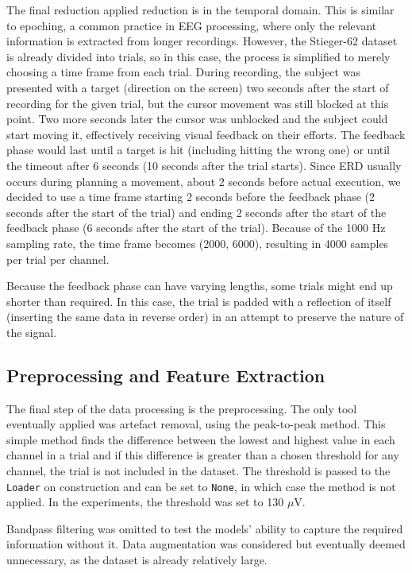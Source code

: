 \documentclass[english, he, bc, kiv, iso690alph, viewonly]{fasthesis}
\begin{document}
The final reduction applied reduction is in the temporal domain. This is similar to epoching, a common practice in EEG processing, where only the relevant information is extracted from longer recordings. However, the Stieger-62 dataset is already divided into trials, so in this case, the process is simplified to merely choosing a time frame from each trial. During recording, the subject was presented with a target (direction on the screen) two seconds after the start of recording for the given trial, but the cursor movement was still blocked at this point. Two more seconds later the cursor was unblocked and the subject could start moving it, effectively receiving visual feedback on their efforts. The feedback phase would last until a target is hit (including hitting the wrong one) or until the timeout after 6 seconds (10 seconds after the trial starts). Since ERD usually occurs during planning a movement, about 2 seconds before actual execution, we decided to use a time frame starting 2 seconds before the feedback phase (2 seconds after the start of the trial) and ending 2 seconds after the start of the feedback phase (6 seconds after the start of the trial). Because of the 1000 Hz sampling rate, the time frame becomes (2000, 6000), resulting in 4000 samples per trial per channel.


Because the feedback phase can have varying lengths, some trials might end up shorter than required. In this case, the trial is padded with a reflection of itself (inserting the same data in reverse order) in an attempt to preserve the nature of the signal.

\subsection{Preprocessing and Feature Extraction}

The final step of the data processing is the preprocessing. The only tool eventually applied was artefact removal, using the peak-to-peak method. This simple method finds the difference between the lowest and highest value in each channel in a trial and if this difference is greater than a chosen threshold for any channel, the trial is not included in the dataset. The threshold is passed to the \texttt{Loader} on construction and can be set to \texttt{None}, in which case the method is not applied. In the experiments, the threshold was set to 130 $\mu$V.

Bandpass filtering was omitted to test the models' ability to capture the required information without it. Data augmentation was considered but eventually deemed unnecessary, as the dataset is already relatively large.
\end{document}
